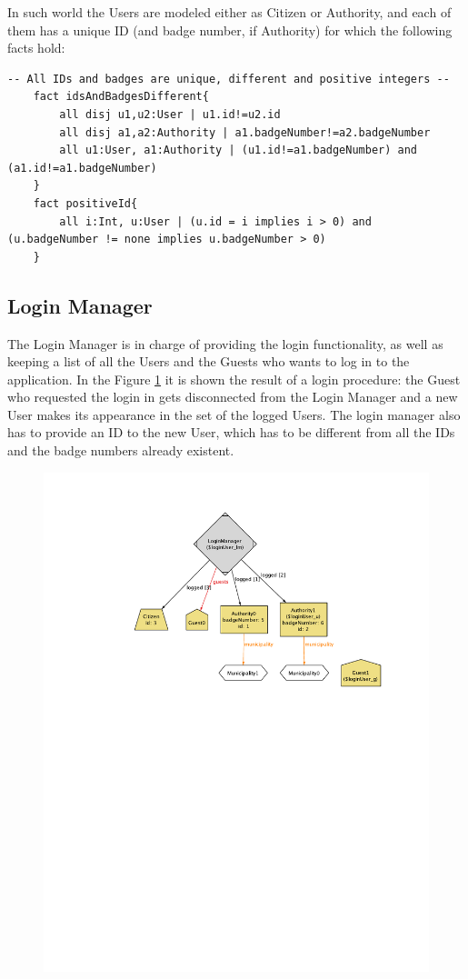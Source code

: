 \documentclass{report}
\begin{document}
In such world the Users are modeled either as Citizen or Authority, and each of them has a unique ID (and badge number, if Authority) for which the following facts hold:
\begin{lstlisting}[language=alloy]
	-- All IDs and badges are unique, different and positive integers --
	fact idsAndBadgesDifferent{
		all disj u1,u2:User | u1.id!=u2.id 
		all disj a1,a2:Authority | a1.badgeNumber!=a2.badgeNumber 
		all u1:User, a1:Authority | (u1.id!=a1.badgeNumber) and (a1.id!=a1.badgeNumber)
	}
	fact positiveId{
		all i:Int, u:User | (u.id = i implies i > 0) and (u.badgeNumber != none implies u.badgeNumber > 0)
	}
\end{lstlisting}

\subsection{Login Manager}
The Login Manager is in charge of providing the login functionality, as well as keeping a list of all the Users and the Guests who wants to log in to the application. In the Figure \ref{fig:allogin} it is shown the result of a login procedure: the Guest who requested the login in gets disconnected from the Login Manager and a new User makes its appearance in the set of the logged Users. The login manager also has to provide an ID to the new User, which has to be different from all the IDs and the badge numbers already existent.
\begin{figure}[ht!]
	\begin{center}
	\includegraphics[width=.8\textwidth]{./img/Login.pdf}
	\label{fig:allogin}
	\caption{}
	\end{center}
\end{figure}\\
\end{document}

